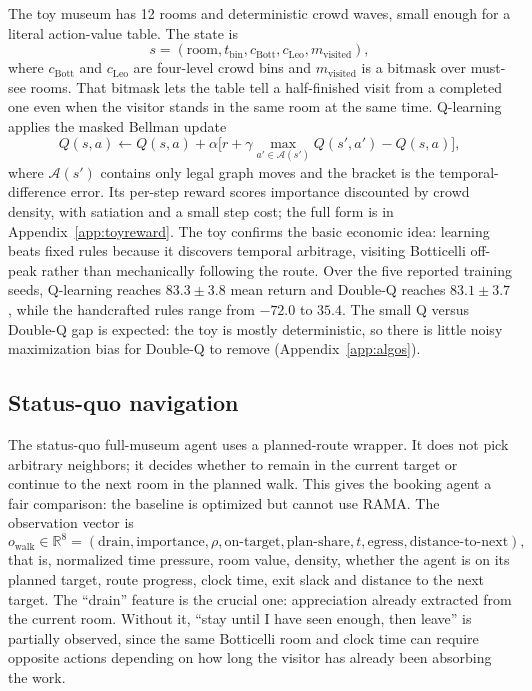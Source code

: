 \documentclass[11pt]{article}
\numberwithin{equation}{section} %
\newcommand{\R}{\mathbb{R}}
\newcommand{\Acal}{\mathcal{A}}
\begin{document}
The toy museum has 12 rooms and deterministic crowd waves, small enough for a literal action-value table. The
state is
\[
s=(\text{room},t_{\text{bin}},c_{\text{Bott}},c_{\text{Leo}},m_{\text{visited}}),
\]
where $c_{\text{Bott}}$ and $c_{\text{Leo}}$ are four-level crowd bins and $m_{\text{visited}}$ is a bitmask
over must-see rooms. That bitmask lets the table tell a half-finished visit from a completed one even when the
visitor stands in the same room at the same time. Q-learning applies the masked Bellman update
\begin{equation}
Q(s,a)\leftarrow Q(s,a)+\alpha\Big[r+\gamma\max_{a'\in \Acal(s')}Q(s',a')-Q(s,a)\Big],
\label{eq:bellman}
\end{equation}
where $\Acal(s')$ contains only legal graph moves and the bracket is the temporal-difference error. Its
per-step reward scores importance discounted by crowd density, with satiation and a small step cost; the full
form is in Appendix~\ref{app:toyreward}. The toy confirms the basic economic idea: learning beats fixed rules
because it discovers temporal arbitrage, visiting Botticelli off-peak rather than mechanically following the
route. Over the five reported training seeds, Q-learning reaches $83.3\pm3.8$ mean return and Double-Q reaches
$83.1\pm3.7$, while the handcrafted rules range from $-72.0$ to $35.4$. The small Q versus Double-Q gap is
expected: the toy is mostly deterministic, so there is little noisy maximization bias for Double-Q to remove
(Appendix~\ref{app:algos}).

\subsection{Status-quo navigation}

The status-quo full-museum agent uses a planned-route wrapper. It does not pick arbitrary neighbors; it
decides whether to remain in the current target or continue to the next room in the planned walk. This gives
the booking agent a fair comparison: the baseline is optimized but cannot use RAMA. The observation vector is
\[
o_{\text{walk}}\in\R^8 =
(\text{drain},\text{importance},\rho,\text{on-target},\text{plan-share},t,\text{egress},
\text{distance-to-next}),
\]
that is, normalized time pressure, room value, density, whether the agent is on its planned target, route
progress, clock time, exit slack and distance to the next target. The ``drain'' feature is the crucial one:
appreciation already extracted from the current room. Without it, ``stay until I have seen enough, then
leave'' is partially observed, since the same Botticelli room and clock time can require opposite actions
depending on how long the visitor has already been absorbing the work.
\end{document}
